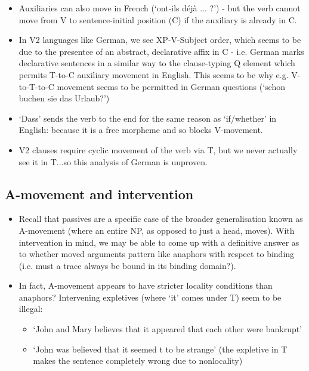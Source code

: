 \documentclass{article}
\begin{document}
\begin{itemize}
\begin{itemize}
        \item Auxiliaries can also move in French (`ont-ils déjà ... ?') - but the verb cannot move from V to sentence-initial position (C) if the auxiliary is already in C.
        \item In V2 languages like German, we see XP-V-Subject order, which seems to be due to the presentce of an abstract, declarative affix in C - i.e. German marks declarative sentences in a similar way to the clause-typing Q element which permits T-to-C auxiliary movement in English. This seems to be why e.g. V-to-T-to-C movement seems to be permitted in German questions (`schon buchen sie das Urlaub?')
        \item `Dass' sends the verb to the end for the same reason as `if/whether' in English: because it is a free morpheme and so blocks V-movement.
        \item V2 clauses require cyclic movement of the verb via T, but we never actually see it in T...so this analysis of German is unproven.
    \end{itemize}
\end{itemize}
\subsection{A-movement and intervention}
\begin{itemize}
    \item Recall that passives are a specific case of the broader generalisation known as A-movement (where an entire NP, as opposed to just a head, moves). With intervention in mind, we may be able to come up with a definitive answer as to whether moved arguments pattern like anaphors with respect to binding (i.e. must a trace always be bound in its binding domain?).
    \item In fact, A-movement appears to have stricter locality conditions than anaphors? Intervening expletives (where `it' comes under T) seem to be illegal:
    \begin{itemize}
        \item `John and Mary believes that it appeared that each other were bankrupt'
        \item `John was believed that it seemed t to be strange' (the expletive in T makes the sentence completely wrong due to nonlocality)
    \end{itemize}
\end{itemize}
\end{document}
